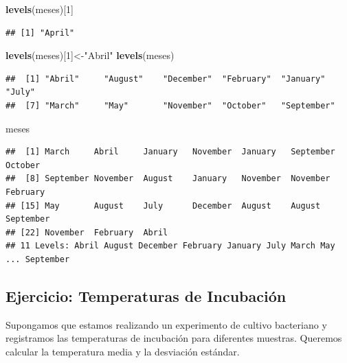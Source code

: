 \documentclass[
]{book}
\newenvironment{Shaded}{\begin{snugshade}}{\end{snugshade}}
\newcommand{\DecValTok}[1]{\textcolor[rgb]{0.00,0.00,0.81}{#1}}
\newcommand{\FunctionTok}[1]{\textcolor[rgb]{0.13,0.29,0.53}{\textbf{#1}}}
\newcommand{\NormalTok}[1]{#1}
\newcommand{\OtherTok}[1]{\textcolor[rgb]{0.56,0.35,0.01}{#1}}
\newcommand{\StringTok}[1]{\textcolor[rgb]{0.31,0.60,0.02}{#1}}
\begin{document}
\begin{Shaded}
\begin{Highlighting}[]
\FunctionTok{levels}\NormalTok{(meses)[}\DecValTok{1}\NormalTok{]}
\end{Highlighting}
\end{Shaded}

\begin{verbatim}
## [1] "April"
\end{verbatim}

\begin{Shaded}
\begin{Highlighting}[]
\FunctionTok{levels}\NormalTok{(meses)[}\DecValTok{1}\NormalTok{]}\OtherTok{\textless{}{-}}\StringTok{"Abril"}
\FunctionTok{levels}\NormalTok{(meses)}
\end{Highlighting}
\end{Shaded}

\begin{verbatim}
##  [1] "Abril"     "August"    "December"  "February"  "January"   "July"     
##  [7] "March"     "May"       "November"  "October"   "September"
\end{verbatim}

\begin{Shaded}
\begin{Highlighting}[]
\NormalTok{meses}
\end{Highlighting}
\end{Shaded}

\begin{verbatim}
##  [1] March     Abril     January   November  January   September October  
##  [8] September November  August    January   November  November  February 
## [15] May       August    July      December  August    August    September
## [22] November  February  Abril    
## 11 Levels: Abril August December February January July March May ... September
\end{verbatim}

\hypertarget{ejercicio-temperaturas-de-incubaciuxf3n}{%
\subsection{Ejercicio: Temperaturas de Incubación}\label{ejercicio-temperaturas-de-incubaciuxf3n}}

Supongamos que estamos realizando un experimento de cultivo bacteriano y registramos las temperaturas de incubación para diferentes muestras. Queremos calcular la temperatura media y la desviación estándar.
\end{document}
